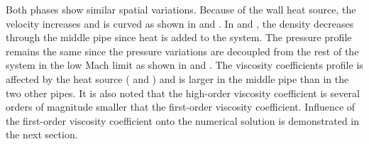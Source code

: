 %
Both phases show similar spatial variations. Because of the wall heat source, the velocity increases and is curved as shown in  and . In  and , the density decreases through the middle pipe since heat is added to the system. The pressure profile remains the same since the pressure variations are decoupled from the rest of the system in the low Mach limit as shown in  and . The viscosity coefficients profile is affected by the heat source ( and ) and is larger in the middle pipe than in the two other pipes. It is also noted that the high-order viscosity coefficient is several orders of magnitude smaller that the first-order viscosity coefficient. Influence of the first-order viscosity coefficient onto the numerical solution is demonstrated in the next section.
